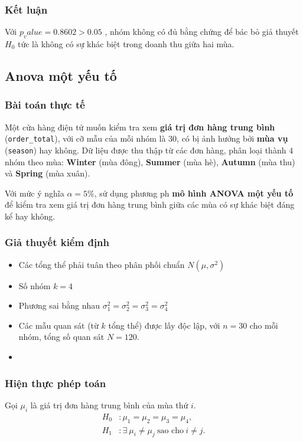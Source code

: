 \subsubsection{Kết luận}
\begin{boxH}

Với $p_value = 0.8602 > 0.05$ , nhóm không có đủ bằng chứng để bác bỏ giả thuyết $H_0$ tức là không có sự khác biệt trong doanh thu giữa hai mùa.

\end{boxH}
\subsection{Anova một yếu tố}

\subsubsection{Bài toán thực tế}
Một cửa hàng điện tử muốn kiểm tra xem \textbf{giá trị đơn hàng trung bình} (\texttt{order\_total}), với cỡ mẫu của mỗi nhóm là $30$, có bị ảnh hưởng bởi \textbf{mùa vụ} (\texttt{season}) hay không.  
Dữ liệu được thu thập từ các đơn hàng, phân loại thành $4$ nhóm theo mùa: \textbf{Winter} (mùa đông), \textbf{Summer} (mùa hè), \textbf{Autumn} (mùa thu) và \textbf{Spring} (mùa xuân).  

Với mức ý nghĩa $\alpha = 5\%$, sử dụng phương ph \textbf{mô hình ANOVA một yếu tố} để kiểm tra xem giá trị đơn hàng trung bình giữa các mùa có sự khác biệt đáng kể hay không.
\subsubsection{Giả thuyết kiểm định}

\begin{itemize}
  \item Các tổng thể phải tuân theo phân phối chuẩn $N(\mu, \sigma^2)$
  \item Số nhóm $k=4$
  \item Phương sai bằng nhau $\sigma_1^2 = \sigma_2^2 = \sigma_3^2 = \sigma_4^2$
  \item Các mẫu quan sát (từ $k$ tổng thể) được lấy độc lập, với $n = 30$ cho mỗi nhóm, tổng số quan sát $N = 120$.
  \item 
\end{itemize}

\subsubsection{Hiện thực phép toán}
Gọi $\mu_i$ là giá trị đơn hàng trung bình của mùa thứ $i$.
\begin{align*}
    H_0 &: \mu_1 = \mu_2 = \mu_3 = \mu_4, \\
    H_1 &: \exists\ \mu_i \neq \mu_j \ \text{sao cho} \ i \neq j.
\end{align*}

